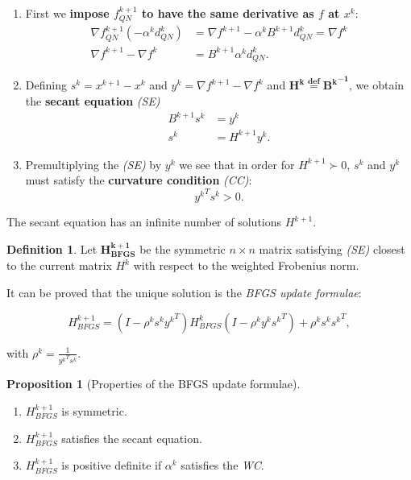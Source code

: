\documentclass[a4paper, 10pt, twocolumn]{article}
\theoremstyle{definition}
\newtheorem*{defn}{Definition}
\newtheorem{prop}[theorem]{Proposition}
\theoremstyle{remark}
\newcommand{\al}{\alpha}
\begin{document}
\begin{enumerate}[label=\roman*.]
\item First we \textbf{impose $f^{k+1}_{QN}$ to have the same derivative as $f$ at $x^k$}:
\vspace{5pt}
\begin{align*}
\nabla f^{k+1}_{QN}(-\al^kd^k_{QN}) &= \nabla f^{k+1} - \al^kB^{k+1}d^k_{QN} = \nabla f^k \\
\nabla f^{k+1} - \nabla f^k &= B^{k+1}\al^kd^k_{QN}.
\end{align*}

\item Defining $s^k = x^{k+1}-x^k$ and $y^k = \nabla f^{k+1} - \nabla f^k$ and $\mathbf{H^k \overset{\text{def}}{=} {B^k}^{-1}}$, we obtain the \textbf{secant equation} \textit{(SE)}
\begin{align*}
B^{k+1}s^k &= y^k \\
s^k &= H^{k+1}y^k.
\end{align*}

\item Premultiplying the \textit{(SE)} by $y^k$ we see that in order for $H^{k+1} \succ 0$, $s^k$ and $y^k$ must satisfy the \textbf{curvature condition} \textit{(CC)}:
$$
{y^k}^Ts^k > 0.
$$
\end{enumerate}

The secant equation has an infinite number of solutions $H^{k+1}$.

\begin{defn}
Let $\mathbf{H^{k+1}_{BFGS}}$ be the symmetric $n\times n$ matrix satisfying \textit{(SE)} closest to the current matrix $H^k$ with respect to the weighted Frobenius norm.
\end{defn}

It can be proved that the unique solution is the \textit{BFGS update formulae}:

$$
H^{k+1}_{BFGS} = (I-\rho^ks^k{y^k}^T)H^k_{BFGS}(I-\rho^ky^k{s^k}^T) + \rho^ks^k{s^k}^T,
$$

with $\rho^k = \frac{1}{{y^k}^Ts^k}$.

\begin{prop}[Properties of the BFGS update formulae]
\
\begin{enumerate}[label=\roman*.]
\item $H^{k+1}_{BFGS}$ is symmetric.
\item $H^{k+1}_{BFGS}$ satisfies the secant equation.
\item $H^{k+1}_{BFGS}$ is positive definite if $\al^k$ satisfies the \textit{WC}.
\end{enumerate}
\end{prop}
\end{document}

